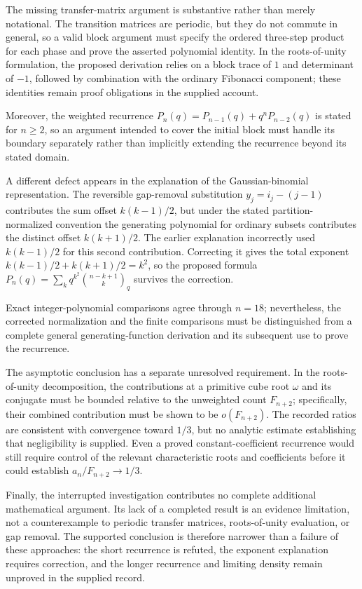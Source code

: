 \documentclass[11pt]{article}
\begin{document}
The missing transfer-matrix argument is substantive rather than merely notational. The transition matrices are periodic, but they do not commute in general, so a valid block argument must specify the ordered three-step product for each phase and prove the asserted polynomial identity. In the roots-of-unity formulation, the proposed derivation relies on a block trace of $1$ and determinant of $-1$, followed by combination with the ordinary Fibonacci component; these identities remain proof obligations in the supplied account.

Moreover, the weighted recurrence $P_n(q)=P_{n-1}(q)+q^nP_{n-2}(q)$ is stated for $n\geq2$, so an argument intended to cover the initial block must handle its boundary separately rather than implicitly extending the recurrence beyond its stated domain.

A different defect appears in the explanation of the Gaussian-binomial representation. The reversible gap-removal substitution $y_j=i_j-(j-1)$ contributes the sum offset $k(k-1)/2$, but under the stated partition-normalized convention the generating polynomial for ordinary subsets contributes the distinct offset $k(k+1)/2$. The earlier explanation incorrectly used $k(k-1)/2$ for this second contribution. Correcting it gives the total exponent $k(k-1)/2+k(k+1)/2=k^2$, so the proposed formula $P_n(q)=\sum_k q^{k^2}\binom{n-k+1}{k}_q$ survives the correction.

Exact integer-polynomial comparisons agree through $n=18$; nevertheless, the corrected normalization and the finite comparisons must be distinguished from a complete general generating-function derivation and its subsequent use to prove the recurrence.

The asymptotic conclusion has a separate unresolved requirement. In the roots-of-unity decomposition, the contributions at a primitive cube root $\omega$ and its conjugate must be bounded relative to the unweighted count $F_{n+2}$; specifically, their combined contribution must be shown to be $o(F_{n+2})$. The recorded ratios are consistent with convergence toward $1/3$, but no analytic estimate establishing that negligibility is supplied. Even a proved constant-coefficient recurrence would still require control of the relevant characteristic roots and coefficients before it could establish $a_n/F_{n+2}\to1/3$.

Finally, the interrupted investigation contributes no complete additional mathematical argument. Its lack of a completed result is an evidence limitation, not a counterexample to periodic transfer matrices, roots-of-unity evaluation, or gap removal. The supported conclusion is therefore narrower than a failure of these approaches: the short recurrence is refuted, the exponent explanation requires correction, and the longer recurrence and limiting density remain unproved in the supplied record.
\end{document}
